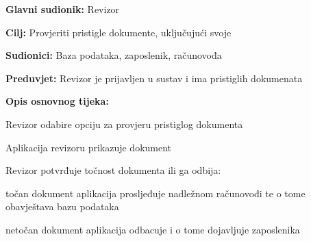 					\noindent {}
					\begin{packed_item}
	
						\item \textbf{Glavni sudionik:} Revizor
						\item  \textbf{Cilj:} Provjeriti pristigle dokumente, uključujući svoje
						\item  \textbf{Sudionici:} Baza podataka, zaposlenik, računovođa
						\item  \textbf{Preduvjet:} Revizor je prijavljen u sustav i ima pristiglih dokumenata
						\item  \textbf{Opis osnovnog tijeka:}
						
						\item[] \begin{packed_enum}
	
							\item Revizor odabire opciju za provjeru pristiglog dokumenta
							\item Aplikacija revizoru prikazuje dokument
							\item Revizor potvrđuje točnost dokumenta ili ga odbija:
							
							\begin{packed_enum}
								
								\item točan dokument aplikacija prosljeđuje nadležnom računovođi te o tome obavještava bazu podataka
								\item netočan dokument aplikacija odbacuje i o tome dojavljuje zaposlenika

							\end{packed_enum}

						\end{packed_enum}

					\end{packed_item}


